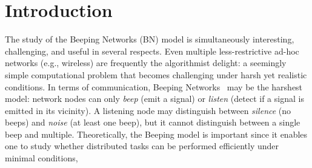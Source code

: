 \section{Introduction}

The study of the Beeping Networks (BN) model is simultaneously interesting, challenging, and useful in several respects. 
Even 
multiple less-restrictive ad-hoc networks (e.g., wireless) 
are frequently the algorithmist delight: a seemingly simple computational problem that becomes challenging under harsh yet realistic conditions.  In terms of communication, Beeping Networks~\cite{cornejo2010deploying} may be the harshest model: network nodes can only \emph{beep} (emit a signal) or \emph{listen} (detect if a signal is emitted in its vicinity). A listening node may distinguish between \emph{silence} (no beeps) and \emph{noise} (at least one beep), but it cannot distinguish between a single beep and multiple. Theoretically, the Beeping model is important since it enables one to study whether distributed tasks can be performed efficiently under minimal conditions,


